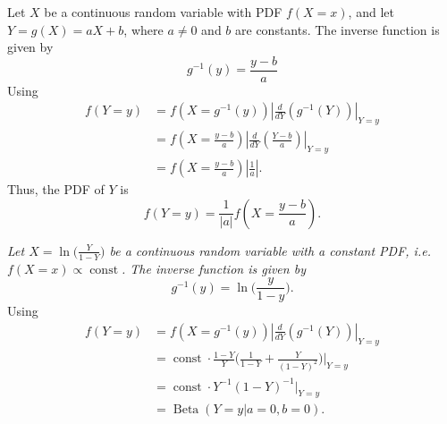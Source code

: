 \begin{example}
	Let $X$ be a continuous random variable with PDF $f(X =x)$, and let $Y = g(X) = aX + b$, where $a \neq 0$ and $b$ are constants. The inverse function is given by
	\begin{equation}
		g^{-1}(y) = \frac{y - b}{a}
	\end{equation}
	Using 
	\begin{equation}
		\begin{split}
			f(Y=y) &= f\left( X = g^{-1}(y) \right) \left| \frac{d}{d Y} \left( g^{-1}(Y) \right) \right|_{Y=y} \\
			&= f\left(X =  \frac{y - b}{a} \right) \left| \frac{d}{d Y} \left( \frac{Y - b}{a} \right) \right|_{Y=y} \\
			&= f\left(X = \frac{y - b}{a} \right) \left| \frac{1}{a} \right|.
		\end{split}
	\end{equation}
	Thus, the PDF of $Y$ is
	\begin{equation}
		f(Y= y) = \frac{1}{|a|} f\left(X =  \frac{y - b}{a} \right).
	\end{equation}
\end{example}

\begin{example}
	\emph{Let $X = \ln\big(\frac{Y}{1-Y}\big)$ be a continuous random variable with a constant PDF, i.e. $f(X=x)\propto \operatorname{const}$. The inverse function is given by}
	\begin{equation}
		g^{-1}(y) = \ln\bigg(\frac{y}{1-y}\bigg).
	\end{equation}
	Using 
	\begin{equation}
		\begin{split}
			f(Y=y) &= f\left( X = g^{-1}(y) \right) \left| \frac{d}{d Y} \left( g^{-1}(Y) \right) \right|_{Y=y}\\
			& = \operatorname{const}\cdot \frac{1-Y}{Y}\bigg(\frac{1}{1-Y}+\frac{Y}{(1-Y)^2}\bigg)\bigg|_{Y=y}\\
			&=\operatorname{const}\cdot Y^{-1}(1-Y)^{-1}|_{Y=y}\\
			&=\operatorname{Beta}(Y=y|a=0,b=0).
		\end{split}
	\end{equation}
\end{example}

